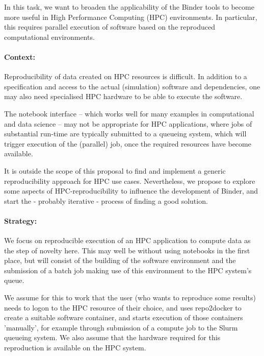\begin{task}[
  title=Binder at HPC facilities,
  id=binder-at-hpc,
  lead=MP,
  PM=17,
  wphases={0-36},
  partners={IFR,UIO}
]
In this task, we want to broaden the applicability of the Binder tools to become
more useful in High Performance Computing (HPC) environments. In particular, this
requires parallel execution of software based on the reproduced computational environments.

\paragraph*{Context:}
Reproducibility of data created on HPC resources is difficult. In addition to
a specification and access to the actual (simulation) software and dependencies,
one may also need specialised HPC hardware to be able to execute the software.

The notebook interface -- which works well for many examples in computational and
data science -- may not be appropriate for HPC applications, where jobs of
substantial run-time are typically submitted to a queueing system, which will
trigger execution of the (parallel) job, once the required resources have become
available.

It is outside the scope of this proposal to find and implement a generic
reproducibility approach for HPC use cases. Nevertheless, we propose to explore
some aspects of HPC-reproducibility to influence the development of Binder,
and start the - probably iterative - process of finding a good solution.

\paragraph*{Strategy:}
We focus on reproducible execution of an HPC application to compute data as the step of
novelty here. This may well be without using notebooks in the first place, but will consist of the
building of the software environment and the submission of a batch job making use of this
environment to the HPC system's queue.

We assume for this to work that the user (who wants to reproduce some results)
needs to logon to the HPC resource of their choice, and uses repo2docker to
create a suitable software container, and starts execution of those containers
'manually', for example through submission of a compute job to the Slurm
queueing system. We also assume that the hardware required for this reproduction
is available on the HPC system.


\end{task}
